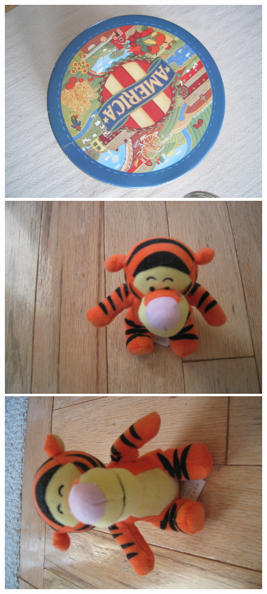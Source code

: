 \documentclass[twocolumn]{article}
\begin{document}
\begin{figure}
{				\includegraphics[scale=0.091]{ukbench00006.jpg}
				\includegraphics[scale=0.091]{ukbench03810.jpg}
				\includegraphics[scale=0.091]{ukbench03811.jpg}
}
\end{figure}
\end{document}
